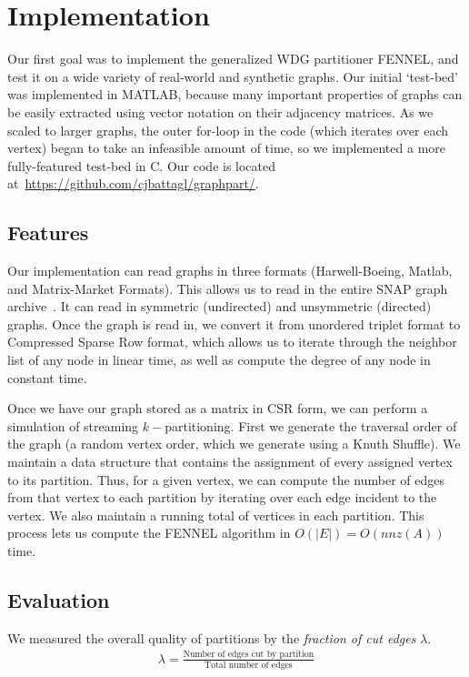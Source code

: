 \documentclass[11pt]{article}
\begin{document}
\section{Implementation}
Our first goal was to implement the generalized WDG partitioner FENNEL, and test it on a wide variety of real-world and synthetic graphs. Our initial `test-bed' was implemented in MATLAB, because many important properties of graphs can be easily extracted using vector notation on their adjacency matrices. As we scaled to larger graphs, the outer for-loop in the code (which iterates over each vertex) began to take an infeasible amount of time, so we implemented a more fully-featured test-bed in C. Our code is located at~\url{https://github.com/cjbattagl/graphpart/}.

\subsection{Features}
Our implementation can read graphs in three formats (Harwell-Boeing, Matlab, and Matrix-Market Formats). This allows us to read in the entire SNAP graph archive~\cite{Leskovec-data}. It can read in symmetric (undirected) and unsymmetric (directed) graphs. Once the graph is read in, we convert it from unordered triplet format to Compressed Sparse Row format, which allows us to iterate through the neighbor list of any node in linear time, as well as compute the degree of any node in constant time.

Once we have our graph stored as a matrix in CSR form, we can perform a simulation of streaming $k-$partitioning. First we generate the traversal order of the graph (a random vertex order, which we generate using a Knuth Shuffle). We maintain a data structure that contains the assignment of every assigned vertex to its partition. Thus, for a given vertex, we can compute the number of edges from that vertex to each partition by iterating over each edge incident to the vertex. We also maintain a running total of vertices in each partition. This process lets us compute the FENNEL algorithm in $O(|E|)=O(nnz(A))$ time. 

\subsection{Evaluation}

We measured the overall quality of partitions by the \textit{fraction of cut edges} $\lambda$.
\begin{align}\lambda = \frac{\text{Number of edges cut by partition}}{\text{Total number of edges}}\end{align}
\end{document}
